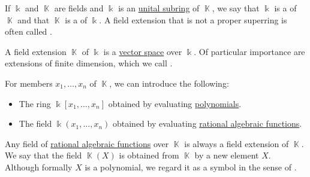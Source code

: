 \begin{definition}\label{def:field_extension}
  If \( \Bbbk \) and \( \BbbK \) are fields and \( \Bbbk \) is an \hyperref[def:ring/submodel]{unital subring} of \( \BbbK \), we say that \( \Bbbk \) is a  of \( \BbbK \) and that \( \BbbK \) is a  of \( \Bbbk \). A field extension that is not a proper superring is often called .

  \begin{thmenum}
     A field extension \( \BbbK \) of \( \Bbbk \) is a \hyperref[def:vector_space]{vector space} over \( \Bbbk \). Of particular importance are extensions of finite dimension, which we call .

     For members \( x_1, \ldots, x_n \) of \( \BbbK \), we can introduce the following:
    \begin{itemize}
      \item The ring \( \Bbbk[x_1, \ldots, x_n] \) obtained by evaluating \hyperref[thm:polynomial_ring_universal_property]{polynomials}.
      \item The field \( \Bbbk(x_1, \ldots, x_n) \) obtained by evaluating \hyperref[def:rational_algebraic_function]{rational algebraic functions}.
    \end{itemize}
  \end{thmenum}
\end{definition}

\begin{remark}\label{rem:adjoint_extension_field}
  Any field of \hyperref[def:rational_algebraic_function]{rational algebraic functions} over \( \BbbK \) is always a field extension of \( \BbbK \). We say that the field \( \BbbK(X) \) is obtained from \( \BbbK \) by  a new element \( X \). Although formally \( X \) is a polynomial, we regard it as a symbol in the sense of .
\end{remark}

